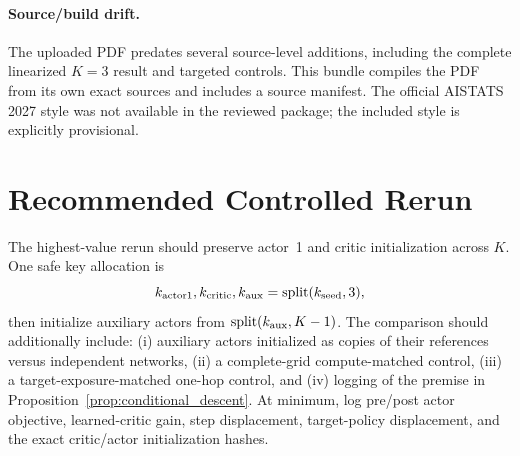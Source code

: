 \paragraph{Source/build drift.}
The uploaded PDF predates several source-level additions, including the complete linearized $K=3$ result and targeted controls. This bundle compiles the PDF from its own exact sources and includes a source manifest. The official AISTATS 2027 style was not available in the reviewed package; the included style is explicitly provisional.

\section{Recommended Controlled Rerun}
\label{app:rerun}

The highest-value rerun should preserve actor~1 and critic initialization across $K$. One safe key allocation is
\begin{equation*}
 k_{\rm actor1},k_{\rm critic},k_{\rm aux}
 =\operatorname{split}(k_{\rm seed},3),
\end{equation*}
then initialize auxiliary actors from $\operatorname{split}(k_{\rm aux},K-1)$. The comparison should additionally include: (i) auxiliary actors initialized as copies of their references versus independent networks, (ii) a complete-grid compute-matched control, (iii) a target-exposure-matched one-hop control, and (iv) logging of the premise in Proposition~\ref{prop:conditional_descent}. At minimum, log pre/post actor objective, learned-critic gain, step displacement, target-policy displacement, and the exact critic/actor initialization hashes.
